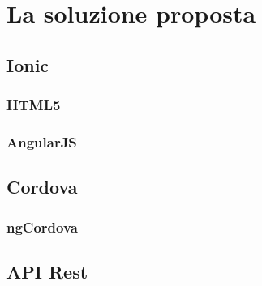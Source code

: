 \chapter{La soluzione proposta}
\section{Ionic}
\subsection{HTML5}
\subsection{AngularJS}
\section{Cordova}
\subsection{ngCordova}
\section{API Rest}

